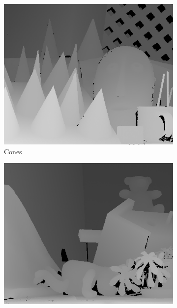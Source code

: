 \documentclass[letterpaper,12pt]{article}
\begin{document}
\begin{figure}
\begin{subfigure}[b]{0.2\textwidth}
                \label{fig:venus}
        \end{subfigure}
        \\
        \begin{subfigure}[b]{0.2\textwidth}
                \includegraphics[width=\textwidth]{conesGT.png}
                \caption{Cones}
                \label{fig:cones}
        \end{subfigure}%
        \quad
        \begin{subfigure}[b]{0.2\textwidth}
                \includegraphics[width=\textwidth]{teddyGT.png}

\end{subfigure}
\end{figure}
\end{document}
